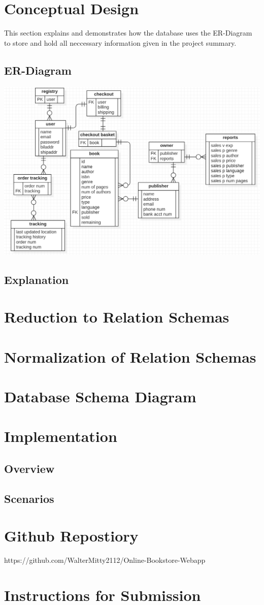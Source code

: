 \documentclass[a4 paper]{article}
\begin{document}

\tableofcontents
\newpage
\section{Conceptual Design}
This section explains and demonstrates how the database uses the ER-Diagram to store and hold all neccessary information given in the project summary. 
\subsection{ER-Diagram}
{\centering \includegraphics[width=\textwidth/2]{ER_D.png}}
\subsection{Explanation}
\section{Reduction to Relation Schemas}
\section{Normalization of Relation Schemas}
\section{Database Schema Diagram}
\section{Implementation}
\subsection{Overview}
\subsection{Scenarios}
\section{Github Repostiory}
https://github.com/WalterMitty2112/Online-Bookstore-Webapp
\section{Instructions for Submission}
\end{document}
